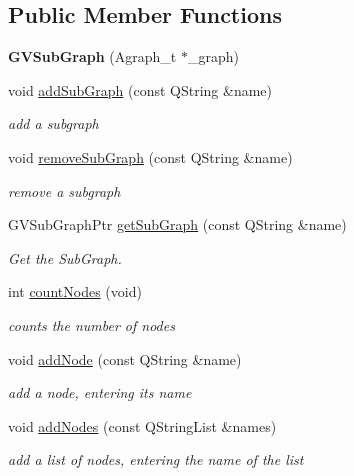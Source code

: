 \subsection*{\-Public \-Member \-Functions}
\begin{DoxyCompactItemize}
\item 
\hypertarget{class_g_v_sub_graph_a2a830f5288096466cff627fb221003f3}{{\bfseries \-G\-V\-Sub\-Graph} (\-Agraph\-\_\-t $\ast$\-\_\-graph)}\label{class_g_v_sub_graph_a2a830f5288096466cff627fb221003f3}

\item 
void \hyperlink{class_g_v_sub_graph_a7999f5541dde4ad692b8f1765675e106}{add\-Sub\-Graph} (const \-Q\-String \&name)
\begin{DoxyCompactList}\small\item\em add a subgraph \end{DoxyCompactList}\item 
void \hyperlink{class_g_v_sub_graph_a1bed9f509bbe210754ed6e2878a75dff}{remove\-Sub\-Graph} (const \-Q\-String \&name)
\begin{DoxyCompactList}\small\item\em remove a subgraph \end{DoxyCompactList}\item 
\-G\-V\-Sub\-Graph\-Ptr \hyperlink{class_g_v_sub_graph_abfbc0deb675aaf2e0bf0551b17506818}{get\-Sub\-Graph} (const \-Q\-String \&name)
\begin{DoxyCompactList}\small\item\em \-Get the \-Sub\-Graph. \end{DoxyCompactList}\item 
int \hyperlink{class_g_v_sub_graph_af0087db5d9f5a53132f1b46b636377f9}{count\-Nodes} (void)
\begin{DoxyCompactList}\small\item\em counts the number of nodes \end{DoxyCompactList}\item 
void \hyperlink{class_g_v_sub_graph_a99ea8e4c658ea76fc5425644a460362d}{add\-Node} (const \-Q\-String \&name)
\begin{DoxyCompactList}\small\item\em add a node, entering its name \end{DoxyCompactList}\item 
void \hyperlink{class_g_v_sub_graph_af805b3fbfb96c0b1cb99ecc311f1a7f8}{add\-Nodes} (const \-Q\-String\-List \&names)
\begin{DoxyCompactList}\small\item\em add a list of nodes, entering the name of the list \end{DoxyCompactList}\item 

\end{DoxyCompactItemize}
